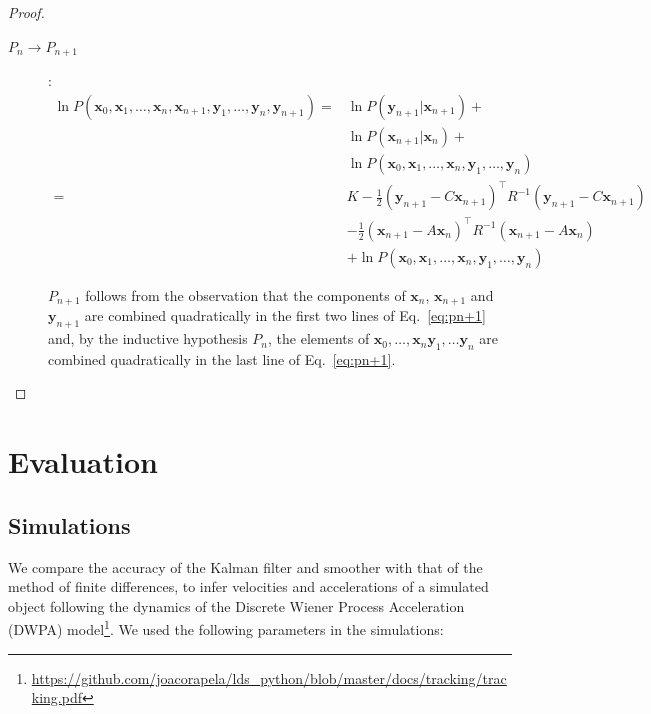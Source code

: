 \documentclass[12pt]{article}
\begin{document}
\begin{proof}
\begin{description}
        \item[$P_n\rightarrow P_{n+1}$]:
            \begin{align}
                \ln P(\mathbf{x}_0, \mathbf{x}_1, \ldots, \mathbf{x}_n, \mathbf{x}_{n+1},\mathbf{y}_1, \ldots, \mathbf{y}_{n}, \mathbf{y}_{n+1})=&\ln P(\mathbf{y}_{n+1}|\mathbf{x}_{n+1})+\nonumber\\
                &\ln P(\mathbf{x}_{n+1}|\mathbf{x}_n)+\nonumber\\
                &\ln P(\mathbf{x}_0,\mathbf{x}_1,\ldots,\mathbf{x}_n,\mathbf{y}_1, \ldots, \mathbf{y}_{n})\nonumber\\
                =&K-\frac{1}{2}(\mathbf{y}_{n+1}-C\mathbf{x}_{n+1})^\intercal R^{-1}(\mathbf{y}_{n+1}-C\mathbf{x}_{n+1})\nonumber\\
                 &-\frac{1}{2}(\mathbf{x}_{n+1}-A\mathbf{x}_{n})^\intercal R^{-1}(\mathbf{x}_{n+1}-A\mathbf{x}_{n})\nonumber\\
                 &+\ln P(\mathbf{x}_0,\mathbf{x}_1,\ldots,\mathbf{x}_n,\mathbf{y}_1, \ldots, \mathbf{y}_{n})\label{eq:pn+1}
            \end{align}

            $P_{n+1}$ follows from the observation that the components of
            $\mathbf{x}_n$, $\mathbf{x}_{n+1}$ and $\mathbf{y}_{n+1}$ are combined
            quadratically in the first two lines of Eq.~\ref{eq:pn+1} and, by
            the inductive hypothesis $P_n$, the elements of
            $\mathbf{x}_0,\ldots,\mathbf{x}_n\mathbf{y}_1,\ldots\mathbf{y}_n$
            are combined quadratically in the last line of Eq.~\ref{eq:pn+1}.

    \end{description}

\end{proof}

\section{Evaluation}

\subsection{Simulations}

We compare the accuracy of the Kalman filter and smoother with that of the
method of finite differences, to infer velocities and accelerations of a
simulated object following the dynamics of the Discrete Wiener Process
Acceleration (DWPA)
model\footnote{\url{https://github.com/joacorapela/lds_python/blob/master/docs/tracking/tracking.pdf}}.  We used the following parameters in the
simulations:
\end{document}
